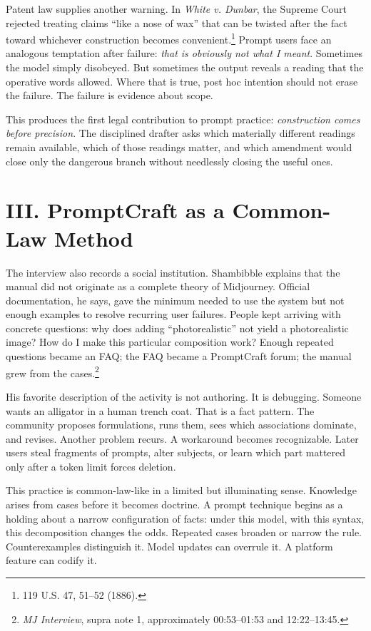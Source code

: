 \documentclass[11pt]{article}
\begin{document}
Patent law supplies another warning. In \emph{White v. Dunbar}, the Supreme Court rejected treating claims ``like a nose of wax'' that can be twisted after the fact toward whichever construction becomes convenient.\footnote{119 U.S. 47, 51--52 (1886).} Prompt users face an analogous temptation after failure: \emph{that is obviously not what I meant}. Sometimes the model simply disobeyed. But sometimes the output reveals a reading that the operative words allowed. Where that is true, post hoc intention should not erase the failure. The failure is evidence about scope.

This produces the first legal contribution to prompt practice: \emph{construction comes before precision}. The disciplined drafter asks which materially different readings remain available, which of those readings matter, and which amendment would close only the dangerous branch without needlessly closing the useful ones.

\section*{III. PromptCraft as a Common-Law Method}
The interview also records a social institution. Shambibble explains that the manual did not originate as a complete theory of Midjourney. Official documentation, he says, gave the minimum needed to use the system but not enough examples to resolve recurring user failures. People kept arriving with concrete questions: why does adding ``photorealistic'' not yield a photorealistic image? How do I make this particular composition work? Enough repeated questions became an FAQ; the FAQ became a PromptCraft forum; the manual grew from the cases.\footnote{\emph{MJ Interview}, supra note 1, approximately 00:53--01:53 and 12:22--13:45.}

His favorite description of the activity is not authoring. It is debugging. Someone wants an alligator in a human trench coat. That is a fact pattern. The community proposes formulations, runs them, sees which associations dominate, and revises. Another problem recurs. A workaround becomes recognizable. Later users steal fragments of prompts, alter subjects, or learn which part mattered only after a token limit forces deletion.

This practice is common-law-like in a limited but illuminating sense. Knowledge arises from cases before it becomes doctrine. A prompt technique begins as a holding about a narrow configuration of facts: under this model, with this syntax, this decomposition changes the odds. Repeated cases broaden or narrow the rule. Counterexamples distinguish it. Model updates can overrule it. A platform feature can codify it.
\end{document}
